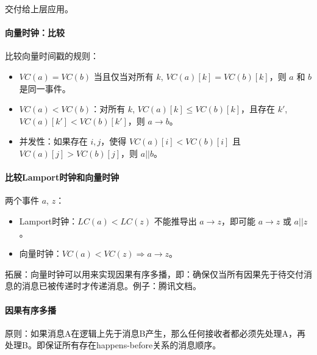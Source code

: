 交付给上层应用。

\paragraph{向量时钟：比较}
比较向量时间戳的规则：
\begin{itemize}
\item $VC(a) = VC(b)$ 当且仅当对所有 $k$, $VC(a)[k] = VC(b)[k]$，则 $a$ 和 $b$ 是同一事件。
\item $VC(a) < VC(b)$：对所有 $k$, $VC(a)[k] \le VC(b)[k]$，且存在 $k'$, $VC(a)[k'] < VC(b)[k']$，则 $a \to b$。
\item 并发性：如果存在 $i,j$，使得 $VC(a)[i] < VC(b)[i]$ 且 $VC(a)[j] > VC(b)[j]$，则 $a || b$。
\end{itemize}

\paragraph{比较Lamport时钟和向量时钟}
两个事件 $a$, $z$：
\begin{itemize}
\item Lamport时钟：$LC(a) < LC(z)$ 不能推导出 $a \to z$，即可能 $a \to z$ 或 $a || z$。
\item 向量时钟：$VC(a) < VC(z) \Rightarrow a \to z$。
\end{itemize}

拓展：向量时钟可以用来实现因果有序多播，即：确保仅当所有因果先于待交付消息的消息已被传递时才传递消息。例子：腾讯文档。

\paragraph{因果有序多播}
原则：如果消息A在逻辑上先于消息B产生，那么任何接收者都必须先处理A，再处理B。即保证所有存在happens-before关系的消息顺序。

